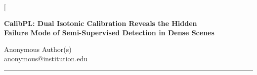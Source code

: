 \documentclass[10pt,twocolumn,letterpaper]{article}
\begin{document}

\twocolumn[{%
\begin{center}
  {\LARGE\bfseries CalibPL: Dual Isotonic Calibration Reveals the Hidden\\
   Failure Mode of Semi-Supervised Detection in Dense Scenes}\par
  \vspace{0.5em}
  {\large Anonymous Author(s)\\
  {\normalsize\ttfamily anonymous@institution.edu}}\par
  \vspace{0.3em}
\end{center}
\vspace{0.4em}
\noindent\rule{\linewidth}{0.2pt}\vspace{0.2em}

}
\end{document}
